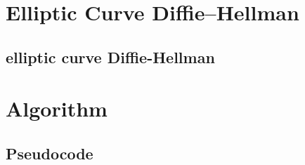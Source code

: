 \documentclass[11pt]{article}
\begin{document}
\section{Elliptic Curve Diffie–Hellman}

\subsection{elliptic curve Diffie-Hellman}

\section{Algorithm}

\subsection{Pseudocode}

\newpage

{}

\end{document}
